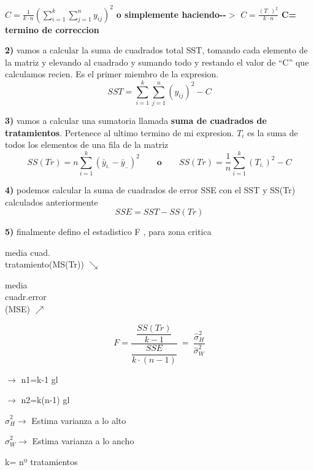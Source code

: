 \documentclass[12pt,a4paper]{article}
\begin{document}
\begin{center}
$\displaystyle C = \frac{1}{k\cdot n}\left(\sum_{i=1}^{k}\sum_{j=1}^{n} y_{ij}\right)^2$
\quad \textbf{o simplemente haciendo-{-}$>$} \quad
$\displaystyle C = \frac{(T_{..})^2}{k\cdot n}$
\hfill \textbf{C= termino de correccion}
\end{center}

\textbf{2)} vamos a calcular la suma de cuadrados total SST, tomando cada elemento de la matriz y elevando al cuadrado y sumando todo y restando el valor de ``C'' que calculamos recien. Es el primer miembro de la expresion.
\[
SST = \sum_{i=1}^{k}\sum_{j=1}^{n} \left(y_{ij}\right)^2 - C
\]

\textbf{3)} vamos a calcular una sumatoria llamada \textbf{suma de cuadrados de tratamientos}. Pertenece al ultimo termino de mi expresion. $T_i$ es la suma de todos los elementos de una fila de la matriz
\[
SS(Tr) = n\sum_{i=1}^{k} (\bar{y}_{i.}-\bar{y}_{..})^2
\qquad \textbf{o} \qquad
SS(Tr) = \frac{1}{n}\sum_{i=1}^{k} (T_{i.})^2 - C
\]

\textbf{4)} podemos calcular la suma de cuadrados de error SSE con el SST y SS(Tr) calculados anteriormente
\[
SSE = SST - SS(Tr)
\]

\textbf{5)} finalmente defino el estadistico F , para zona critica

\vspace{2pt}
\begin{center}
\begin{minipage}[c]{0.22\linewidth}
{\small
media cuad.\\ tratamiento(MS(Tr)) $\searrow$

\vspace{10pt}
media\\ cuadr.error\\ (MSE) $\nearrow$
}
\end{minipage}
\begin{minipage}[c]{0.26\linewidth}
\[
F = \frac{\dfrac{SS(Tr)}{k-1}}{\dfrac{SSE}{k\cdot(n-1)}}
\ = \
\frac{\hat{\sigma}_H^2}{\hat{\sigma}_W^2}
\]
\end{minipage}
\begin{minipage}[c]{0.20\linewidth}
{\small
$\longrightarrow$ n1=k-1 gl

\vspace{10pt}
$\longrightarrow$ n2=k(n-1) gl
}
\end{minipage}
\begin{minipage}[c]{0.30\linewidth}
{\small
$\hat{\sigma}_H^2 \longrightarrow$ Estima varianza a lo alto

\vspace{6pt}
$\hat{\sigma}_W^2 \longrightarrow$ Estima varianza a lo ancho

\vspace{6pt}
\hspace{14pt} k= nº tratamientos
}
\end{minipage}
\end{center}
\end{document}
